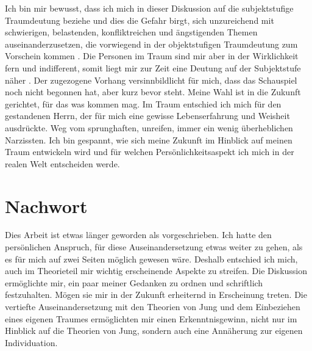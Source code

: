 Ich bin mir bewusst, dass ich mich in dieser Diskussion auf die subjektstufige Traumdeutung beziehe und dies die Gefahr birgt, sich unzureichend mit schwierigen, belastenden, konfliktreichen und ängstigenden Themen auseinanderzusetzen, die vorwiegend in der objektstufigen Traumdeutung zum Vorschein kommen \cite{Roth:2011}. Die Personen im Traum sind mir aber in der Wirklichkeit fern und indifferent, somit liegt mir zur Zeit eine Deutung auf der Subjektstufe näher \cite{Jung:1971}. \newline 
Der zugezogene Vorhang versinnbildlicht für mich, dass das Schauspiel noch nicht begonnen hat, aber kurz bevor steht. Meine Wahl ist in die Zukunft gerichtet, für das was kommen mag. Im Traum entschied ich mich für den gestandenen Herrn, der für mich eine gewisse Lebenserfahrung und Weisheit ausdrückte. Weg vom sprunghaften, unreifen, immer ein wenig überheblichen Narzissten. \newline 
Ich bin gespannt, wie sich meine Zukunft im Hinblick auf meinen Traum entwickeln wird und für welchen Persönlichkeitsaspekt ich mich in der realen Welt entscheiden werde.
\section*{Nachwort}\label{section.nachwort}
Dies Arbeit ist etwas länger geworden als vorgeschrieben. Ich hatte den persönlichen Anspruch, für diese Auseinandersetzung etwas weiter zu gehen, als es für mich auf zwei Seiten möglich gewesen wäre. Deshalb entschied ich mich, auch im Theorieteil mir wichtig erscheinende Aspekte zu streifen. Die Diskussion ermöglichte mir, ein paar meiner Gedanken zu ordnen und schriftlich festzuhalten. Mögen sie mir in der Zukunft erheiternd in Erscheinung treten.\newline
Die vertiefte Auseinandersetzung mit den Theorien von Jung und dem Einbeziehen eines eigenen Traumes ermöglichten mir einen Erkenntnisgewinn, nicht nur im Hinblick auf die Theorien von Jung, sondern auch eine Annäherung zur eigenen Individuation.




